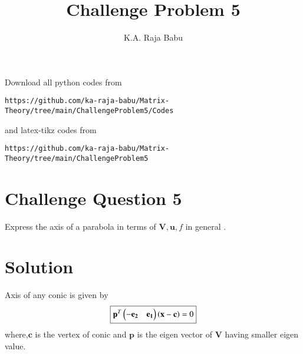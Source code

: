 \documentclass[journal,12pt,twocolumn]{IEEEtran}
\begin{document}
\makeatother
\let\StandardTheFigure\thefigure
\let\vec\mathbf
\renewcommand{\thefigure}{\theproblem}
\def\putbox#1#2#3{\makebox[0in][l]{\makebox[#1][l]{}\raisebox{\baselineskip}[0in][0in]{\raisebox{#2}[0in][0in]{#3}}}}
     \def\rightbox#1{\makebox[0in][r]{#1}}
     \def\centbox#1{\makebox[0in]{#1}}
     \def\topbox#1{\raisebox{-\baselineskip}[0in][0in]{#1}}
     \def\midbox#1{\raisebox{-0.5\baselineskip}[0in][0in]{#1}}
\vspace{3cm}
\title{Challenge Problem 5}
\author{K.A. Raja Babu}
\maketitle
\newpage
\bigskip
\renewcommand{\thefigure}{\theenumi}
\renewcommand{\thetable}{\theenumi}
Download all python codes from 
\begin{lstlisting}
https://github.com/ka-raja-babu/Matrix-Theory/tree/main/ChallengeProblem5/Codes
\end{lstlisting}
%
and latex-tikz codes from 
%
\begin{lstlisting}
https://github.com/ka-raja-babu/Matrix-Theory/tree/main/ChallengeProblem5
\end{lstlisting}
%
\section{Challenge Question 5}

Express the axis of a parabola in terms of $\vec{V},\vec{u},f$ in general .

\section{Solution}

\begin{lemma}
Axis of any conic is given by
\begin{align}
    \boxed{\vec{p}^T\myvec{-\vec{e_2} & \vec{e_1}}\brak{\vec{x}-\vec{c}} = 0}
\end{align}
where,$\vec{c}$ is the vertex of conic and $\vec{p}$ is the eigen vector of $\vec{V}$ having smaller eigen value.
\end{lemma}
\end{document}
